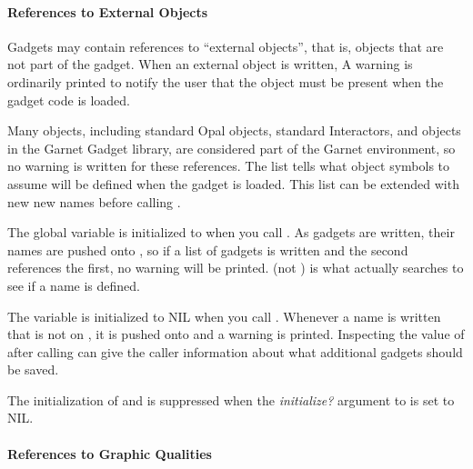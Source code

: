 \paragraph{References to External Objects}
Gadgets may contain references to ``external objects'', that is,
objects that are not part of the gadget.
When an external object is written,
A warning is ordinarily
printed  to notify the user that
the object must be present when the gadget code is loaded.

\value{variable}

Many objects, including standard Opal objects, standard Interactors, and
objects in the Garnet Gadget library, are considered part of the Garnet
environment, so no warning is written for these references.  The list
 tells  what object symbols to assume
will be defined when the gadget is loaded.  This list can be extended
with new new names before calling .

\value{variable}

The global variable  is initialized to
when you call .  As gadgets are written, their names are
pushed onto , so if a list of gadgets is written
and the second references the first, no warning will be printed.
 (not ) is what 
actually searches to see if a name is defined.

\value{variable}

The variable 
is initialized to NIL when you call .
Whenever a name is written that is not on , it
is pushed onto  and a warning is printed.
Inspecting the value of  after calling
 can give the caller information about what
additional gadgets should be saved.

The initialization of  and 
is suppressed when the {\it initialize?} argument to 
is set to NIL.


\paragraph{References to Graphic Qualities}

